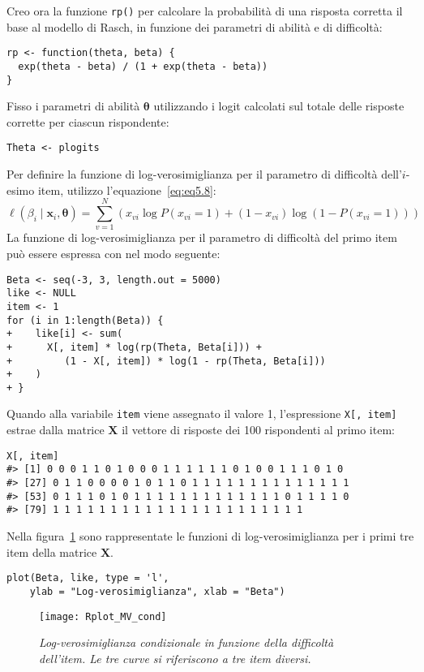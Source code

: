 Creo ora la funzione {\tt rp()} per calcolare la probabilità di una risposta corretta il base al modello di Rasch, in funzione dei parametri di abilità e di difficoltà:
\begin{lstlisting}
rp <- function(theta, beta) {
  exp(theta - beta) / (1 + exp(theta - beta))
}
\end{lstlisting} 
Fisso i parametri di abilità $\boldsymbol{\theta}$ utilizzando i logit calcolati sul totale delle risposte corrette per ciascun rispondente:
\begin{lstlisting}
Theta <- plogits
\end{lstlisting} 
Per definire la funzione di log-verosimiglianza per il parametro di difficoltà dell'$i$-esimo item, utilizzo l'equazione~\ref{eq:eq5.8}:
\begin{equation*}
 \ell (\beta_i \mid \boldsymbol{x}_i, \boldsymbol{\theta}) = \sum_{v=1}^N \left( x_{vi}\log P(x_{vi} = 1) + (1 - x_{vi}) \log(1- P(x_{vi} = 1)) \right)
\label{eq:eq5.8}
\end{equation*}
La funzione di log-verosimiglianza per il parametro di difficoltà del primo item può essere espressa con \R\; nel modo seguente:
\begin{lstlisting}
Beta <- seq(-3, 3, length.out = 5000)
like <- NULL
item <- 1 
for (i in 1:length(Beta)) { 
+    like[i] <- sum( 
+      X[, item] * log(rp(Theta, Beta[i])) + 
+         (1 - X[, item]) * log(1 - rp(Theta, Beta[i])) 
+    ) 
+ } 
\end{lstlisting} 
Quando alla variabile {\tt item} viene assegnato il valore 1, l'espressione {\tt X[, item]} estrae dalla matrice $\boldsymbol{X}$ il vettore di risposte dei 100 rispondenti al primo item:
\begin{lstlisting}
X[, item]
#> [1] 0 0 0 1 1 0 1 0 0 0 1 1 1 1 1 1 0 1 0 0 1 1 1 0 1 0
#> [27] 0 1 1 0 0 0 0 1 0 1 1 0 1 1 1 1 1 1 1 1 1 1 1 1 1 1
#> [53] 0 1 1 1 0 1 0 1 1 1 1 1 1 1 1 1 1 1 1 1 0 1 1 1 1 0
#> [79] 1 1 1 1 1 1 1 1 1 1 1 1 1 1 1 1 1 1 1 1 1 1
\end{lstlisting}
Nella figura~\ref{fig:mv_cond} sono rappresentate le funzioni di log-verosimiglianza per i primi tre item della matrice $\boldsymbol{X}$.
\begin{lstlisting}
plot(Beta, like, type = 'l', 
    ylab = "Log-verosimiglianza", xlab = "Beta")
\end{lstlisting} 
\begin{figure}[tb]
  \centering
    \texttt{[image: Rplot\_MV\_cond]}
    \caption{{\it Log-verosimiglianza condizionale in funzione della difficoltà dell'item.  Le tre curve si riferiscono a tre item diversi.}}
    \label{fig:mv_cond}
\end{figure}
